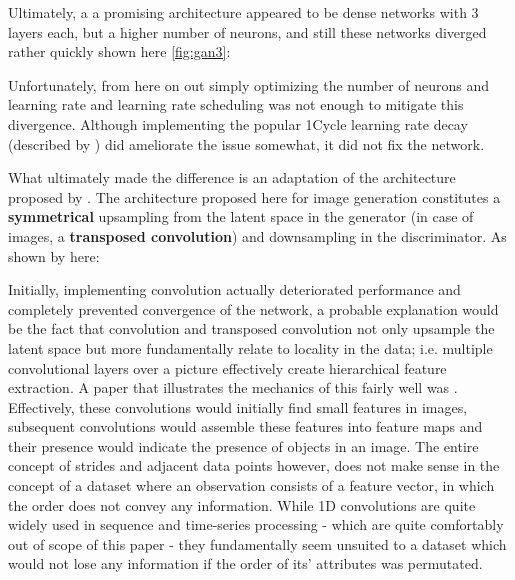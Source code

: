 Ultimately, a a promising architecture appeared to be dense networks with 3 layers each, but a higher number of neurons, and still these networks diverged rather quickly shown here \ref{fig:gan3}:
 

Unfortunately, from here on out simply optimizing the number of neurons and learning rate and learning rate scheduling was not enough to mitigate this divergence. Although implementing the popular 1Cycle learning rate decay (described by \cite{smith_1cycle}) did ameliorate the issue somewhat, it did not fix the network.

\pagebreak

What ultimately made the difference is an adaptation of the architecture proposed by \cite{dcgan}. The architecture proposed here for image generation constitutes a \textbf{symmetrical} upsampling from the latent space in the generator (in case of images, a \textbf{transposed convolution}) and downsampling in the discriminator. As shown by \cite{oversampling_gan} here:


Initially, implementing convolution actually deteriorated performance and completely prevented convergence of the network, a probable explanation would be the fact that convolution and transposed convolution not only upsample the latent space but more fundamentally relate to locality in the data; i.e. multiple convolutional layers over a picture effectively create hierarchical feature extraction. A paper that illustrates the mechanics of this fairly well was \cite{convolution_arithmetic}. Effectively, these convolutions would initially find small features in images, subsequent convolutions would assemble these features into feature maps and their presence would indicate the presence of objects in an image. The entire concept of strides and adjacent data points however, does not make sense in the concept of a dataset where an observation consists of a feature vector, in which the order does not convey any information. While 1D convolutions are quite widely used in sequence and time-series processing - which are quite comfortably out of scope of this paper - they fundamentally seem unsuited to a dataset which would not lose any information if the order of its' attributes was permutated.

